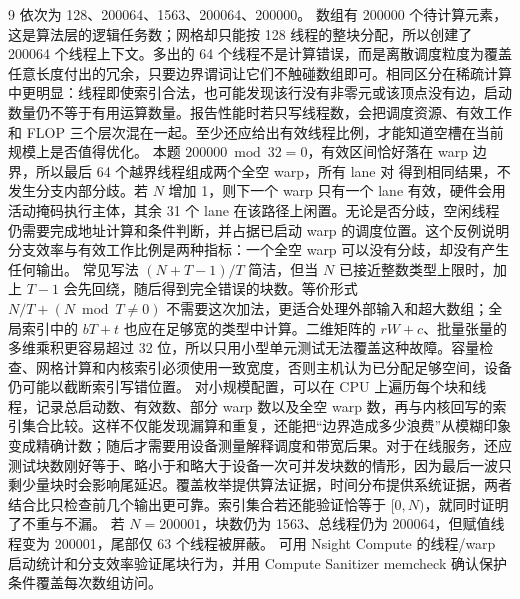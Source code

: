 \begin{solutionexercise}{9}
\conclusionheading 依次为 128、200064、1563、200064、200000。
\discussionheading
{}
数组有 200000 个待计算元素，这是算法层的逻辑任务数；网格却只能按 128 线程的整块分配，所以创建了 200064 个线程上下文。多出的 64 个线程不是计算错误，而是离散调度粒度为覆盖任意长度付出的冗余，只要边界谓词让它们不触碰数组即可。相同区分在稀疏计算中更明显：线程即使索引合法，也可能发现该行没有非零元或该顶点没有边，启动数量仍不等于有用运算数量。报告性能时若只写线程数，会把调度资源、有效工作和 FLOP 三个层次混在一起。至少还应给出有效线程比例，才能知道空槽在当前规模上是否值得优化。
本题 $200000\bmod32=0$，有效区间恰好落在 warp 边界，所以最后 64 个越界线程组成两个全空 warp，所有 lane 对  得到相同结果，不发生分支内部分歧。若 $N$ 增加 1，则下一个 warp 只有一个 lane 有效，硬件会用活动掩码执行主体，其余 31 个 lane 在该路径上闲置。无论是否分歧，空闲线程仍需要完成地址计算和条件判断，并占据已启动 warp 的调度位置。这个反例说明分支效率与有效工作比例是两种指标：一个全空 warp 可以没有分歧，却没有产生任何输出。
常见写法 $(N+T-1)/T$ 简洁，但当 $N$ 已接近整数类型上限时，加上 $T-1$ 会先回绕，随后得到完全错误的块数。等价形式 $N/T+(N\bmod T\ne0)$ 不需要这次加法，更适合处理外部输入和超大数组；全局索引中的 $bT+t$ 也应在足够宽的类型中计算。二维矩阵的 $rW+c$、批量张量的多维乘积更容易超过 32 位，所以只用小型单元测试无法覆盖这种故障。容量检查、网格计算和内核索引必须使用一致宽度，否则主机认为已分配足够空间，设备仍可能以截断索引写错位置。
对小规模配置，可以在 CPU 上遍历每个块和线程，记录总启动数、有效数、部分 warp 数以及全空 warp 数，再与内核回写的索引集合比较。这样不仅能发现漏算和重复，还能把“边界造成多少浪费”从模糊印象变成精确计数；随后才需要用设备测量解释调度和带宽后果。对于在线服务，还应测试块数刚好等于、略小于和略大于设备一次可并发块数的情形，因为最后一波只剩少量块时会影响尾延迟。覆盖枚举提供算法证据，时间分布提供系统证据，两者结合比只检查前几个输出更可靠。索引集合若还能验证恰等于 $[0,N)$，就同时证明了不重与不漏。
\variantheading 若 $N=200001$，块数仍为 1563、总线程仍为 200064，但赋值线程变为 200001，尾部仅 63 个线程被屏蔽。
\practiceheading 可用 Nsight Compute 的线程/warp 启动统计和分支效率验证尾块行为，并用 Compute Sanitizer memcheck 确认保护条件覆盖每次数组访问。
\end{solutionexercise}

